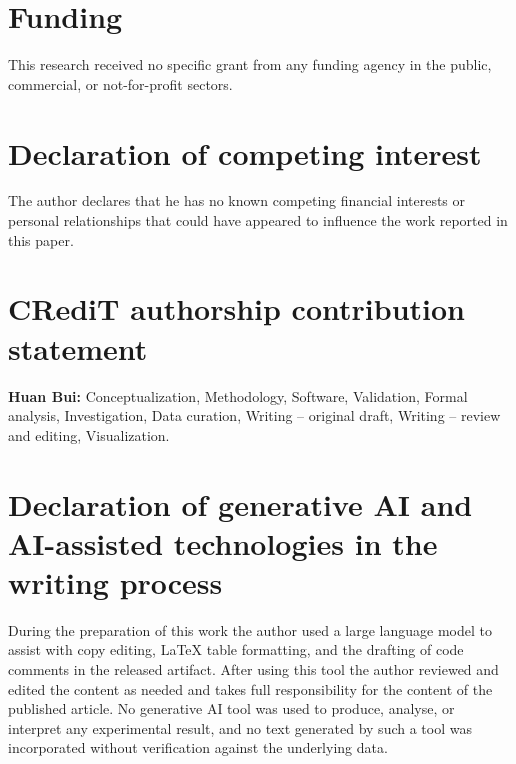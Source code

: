 \documentclass[review]{elsarticle}
\begin{document}
\section*{Funding}
This research received no specific grant from any funding agency in the public, commercial, or
not-for-profit sectors.

\section*{Declaration of competing interest}
The author declares that he has no known competing financial interests or personal relationships
that could have appeared to influence the work reported in this paper.

\section*{CRediT authorship contribution statement}
\textbf{Huan Bui:} Conceptualization, Methodology, Software, Validation, Formal analysis,
Investigation, Data curation, Writing -- original draft, Writing -- review and editing,
Visualization.

\section*{Declaration of generative AI and AI-assisted technologies in the writing process}
During the preparation of this work the author used a large language model to assist with copy
editing, LaTeX table formatting, and the drafting of code comments in the released artifact. After
using this tool the author reviewed and edited the content as needed and takes full responsibility
for the content of the published article. No generative AI tool was used to produce, analyse, or
interpret any experimental result, and no text generated by such a tool was incorporated without
verification against the underlying data.



\end{document}
